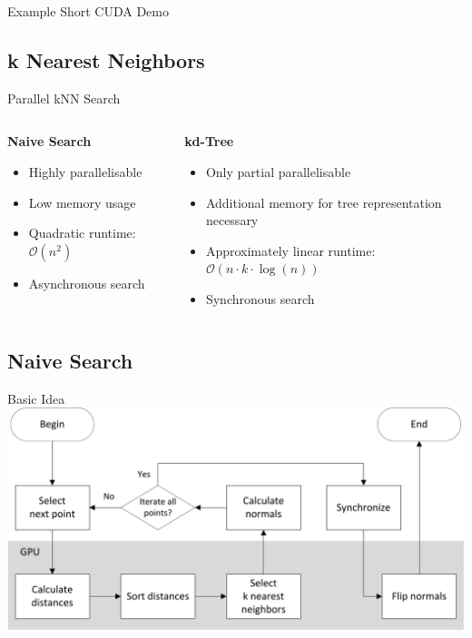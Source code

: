 \documentclass{beamer}
\begin{document}
\begin{frame}{Example}
	\vspace*{\fill}
	\centering \large Short CUDA Demo
	\vspace*{\fill}
\end{frame}

\subsection*{k Nearest Neighbors}

\begin{frame}{Parallel kNN Search}
	\begin{columns}[T]
		\begin{column}{0.5\textwidth}
			\textbf{Naive Search}
			\begin{itemize}
				\item Highly parallelisable
				\item Low memory usage
				\item Quadratic runtime: $\mathcal{O}(n^2)$
				\item Asynchronous search
			\end{itemize}
		\end{column}
		\begin{column}{0.5\textwidth}
			\textbf{kd-Tree}
			\begin{itemize}
				\item Only partial parallelisable
				\item Additional memory for tree representation necessary
				\item Approximately linear runtime: \mbox{$\mathcal{O}(n \cdot k \cdot \log(n))$}
				\item Synchronous search
			\end{itemize}
		\end{column}
	\end{columns}
\end{frame}

\subsection*{Naive Search}

\begin{frame}{Basic Idea}
	\centering
	\includegraphics[width=1.0\textwidth]{knn_procedure.pdf}
\end{frame}
\end{document}
